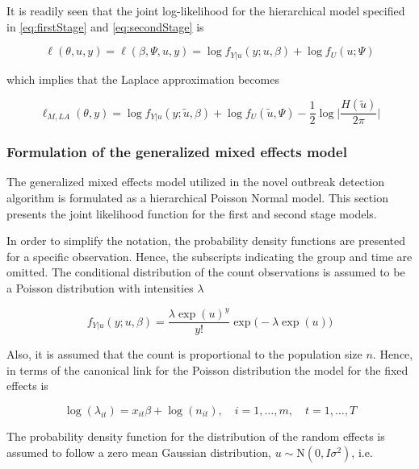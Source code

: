 \documentclass[preprint, 3p, authoryear]{elsarticle} %
\begin{document}
It is readily seen that the joint log-likelihood for the hierarchical model specified in \ref{eq:firstStage} and \ref{eq:secondStage} is

\begin{equation}
  \ell(\theta, u, y) = \ell(\beta, \Psi, u, y) = \log f_{Y|u}(y;u,\beta)+\log f_U(u;\Psi)
\end{equation}

which implies that the Laplace approximation becomes

\begin{equation}
  \ell_{M,LA}(\theta, y)=\log f_{Y|u}(y; \tilde{u},\beta)+\log f_U(\tilde{u}, \Psi)-\frac{1}{2}\log\Bigg|\frac{H(\tilde{u})}{2\pi}\Bigg|
\end{equation}

\hypertarget{formulation-of-the-generalized-mixed-effects-model}{%
\subsubsection{Formulation of the generalized mixed effects model}\label{formulation-of-the-generalized-mixed-effects-model}}

The generalized mixed effects model utilized in the novel outbreak detection algorithm is formulated as a hierarchical Poisson Normal model. This section presents the joint likelihood function for the first and second stage models.

In order to simplify the notation, the probability density functions are presented for a specific observation. Hence, the subscripts indicating the group and time are omitted. The conditional distribution of the count observations is assumed to be a Poisson distribution with intensities \(\lambda\)

\begin{equation}
  f_{Y|u}(y; u, \beta)=\frac{\lambda\exp(u)^{y}}{y!}\exp\big(-\lambda\exp(u)\big)
\end{equation}

Also, it is assumed that the count is proportional to the population size \(n\). Hence, in terms of the canonical link for the Poisson distribution the model for the fixed effects is

\begin{equation}
\log(\lambda_{it})= x_{it} \beta + \log(n_{it}), \quad i=1,\dots,m, \quad t=1,\dots,T
\end{equation}

The probability density function for the distribution of the random effects is assumed to follow a zero mean Gaussian distribution, \(u\sim\mathrm{N}(0,I\sigma^2)\), i.e.
\end{document}
